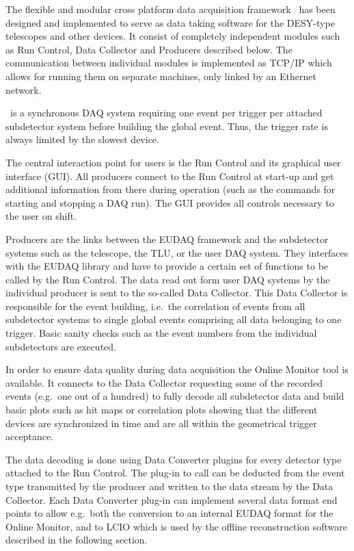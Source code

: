 
The flexible and modular cross platform data acquisition framework \eudaq\ has been designed and implemented to serve as data taking software for the DESY-type telescopes and other devices. 
It consist of completely independent modules such as Run Control, Data Collector and Producers described below. 
The communication between individual modules is implemented as TCP/IP which allows for running them on separate machines, only linked by an Ethernet network.

\eudaq\ is a synchronous DAQ system requiring one event per trigger per attached subdetector system before building the global event. 
Thus, the trigger rate is always limited by the slowest device.

The central interaction point for users is the Run Control and its graphical user interface (GUI). 
All producers connect to the Run Control at start-up and get additional information from there during operation (such as the commands for starting and stopping a DAQ run). 
The GUI provides all controls necessary to the user on shift. 

Producers are the links between the EUDAQ framework and the subdetector systems such as the telescope, the TLU, or the user DAQ system. 
They interfaces with the EUDAQ library and have to provide a certain set of functions to be called by the Run Control. 
The data read out form user DAQ systems by the individual producer is sent to the so-called Data Collector. 
This Data Collector is responsible for the event building, i.e.\ the correlation of events from all subdetector systems to single global events comprising all data belonging to one trigger. 
Basic sanity checks such as the event numbers from the individual subdetectors are executed.

In order to ensure data quality during data acquisition the Online Monitor tool is available. 
It connects to the Data Collector requesting some of the recorded events (e.g.\ one out of a hundred)
 to fully decode all subdetector data and build basic plots such as hit maps or correlation plots showing
  that the different devices are synchronized in time and are all within the geometrical trigger acceptance.

The data decoding is done using Data Converter plugins for every detector type attached to the Run Control. 
The plug-in to call can be deducted from the event type transmitted by the producer and written to the data stream by the Data Collector. 
Each Data Converter plug-in can implement several data format end points to allow e.g.\ both the conversion to an internal EUDAQ format for the Online Monitor,
 and to LCIO which is used by the offline reconstruction software described in the following section.

